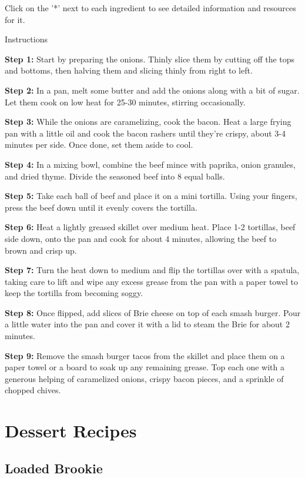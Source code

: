\documentclass[
]{book}
\begin{document}
Click on the '*' next to each ingredient to see detailed information and
resources for it.

Instructions

\textbf{Step 1:} Start by preparing the onions. Thinly slice them by
cutting off the tops and bottoms, then halving them and slicing thinly
from right to left.

\textbf{Step 2:} In a pan, melt some butter and add the onions along
with a bit of sugar. Let them cook on low heat for 25-30 minutes,
stirring occasionally.

\textbf{Step 3:} While the onions are caramelizing, cook the bacon. Heat
a large frying pan with a little oil and cook the bacon rashers until
they're crispy, about 3-4 minutes per side. Once done, set them aside to
cool.

\textbf{Step 4:} In a mixing bowl, combine the beef mince with paprika,
onion granules, and dried thyme. Divide the seasoned beef into 8 equal
balls.

\textbf{Step 5:} Take each ball of beef and place it on a mini tortilla.
Using your fingers, press the beef down until it evenly covers the
tortilla.

\textbf{Step 6:} Heat a lightly greased skillet over medium heat. Place
1-2 tortillas, beef side down, onto the pan and cook for about 4
minutes, allowing the beef to brown and crisp up.

\textbf{Step 7:} Turn the heat down to medium and flip the tortillas
over with a spatula, taking care to lift and wipe any excess grease from
the pan with a paper towel to keep the tortilla from becoming soggy.

\textbf{Step 8:} Once flipped, add slices of Brie cheese on top of each
smash burger. Pour a little water into the pan and cover it with a lid
to steam the Brie for about 2 minutes.

\textbf{Step 9:} Remove the smash burger tacos from the skillet and
place them on a paper towel or a board to soak up any remaining grease.
Top each one with a generous helping of caramelized onions, crispy bacon
pieces, and a sprinkle of chopped chives.

\chapter{Dessert Recipes}\label{dessert-recipes}

\section*{Loaded Brookie}\label{loaded-brookie}
\end{document}
